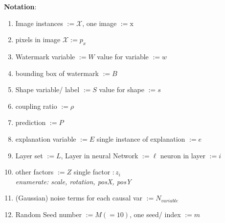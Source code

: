 {\color{codepurple} 
\textbf{Notation}:
\begin{enumerate}
    \item Image instances $:= \mathcal{X}$, one image $:= \mathrm{x}$
    \item pixels in image $\mathcal{X} := p_x$
    \item Watermark variable $:= W$ value for variable $:= w$
    \item bounding box of watermark $:= B$
    \item Shape variable/ label $:= S$ value for shape $:= s$
    \item coupling ratio $:= \rho$
    \item prediction $:= P$
    \item explanation variable $:= E$ single instance of explanation $:= e$
    \item Layer set $:= L$, Layer in neural Network $:= \ell$ neuron in layer $:= i$
    \item other factors $:= Z$ single factor $:z_i$ \\ 
    \textit{enumerate: scale, rotation, posX, posY}
    \item (Gaussian) noise terms for each causal var $:= N_{variable}$
    \item Random Seed number $:= M (=10)$, one seed/ index $:=m$
\end{enumerate}
}